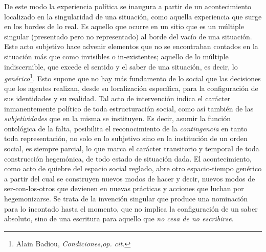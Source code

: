 De este modo la experiencia política se inaugura a partir de un
acontecimiento localizado en la singularidad de una situación, como
aquella experiencia que surge en los bordes de lo real. Es aquello que
ocurre en un sitio que es un múltiple singular (presentado pero no
representado) al borde del vacío de una situación. Este acto subjetivo
hace advenir elementos que no se encontraban contados en la situación
más que como invisibles o in-existentes; aquello de lo múltiple
indiscernible, que excede el sentido y el saber de una situación, es
decir, lo \emph{genérico}\footnote{Alain Badiou, \emph{Condiciones,op.
  cit.}}. Esto supone que no hay más fundamento de lo social que las
decisiones que los agentes realizan, desde su localización específica,
para la configuración de sus identidades y su realidad. Tal acto de
intervención indica el carácter inmanentemente político de toda
estructuración social, como así también de las \emph{subjetividades} que
en la misma se instituyen. Es decir, asumir la función ontológica de la
falta, posibilita el reconocimiento de la \emph{contingencia} en tanto
toda representación, no solo en lo subjetivo sino en la institución de
un orden social, es siempre parcial, lo que marca el carácter
transitorio y temporal de toda construcción hegemónica, de todo estado
de situación dada. El acontecimiento, como acto de quiebre del espacio
social reglado, abre otro espacio-tiempo genérico a partir del cual se
construyen nuevos modos de hacer y decir, nuevos modos de
ser-con-los-otros que devienen en nuevas prácticas y acciones que luchan
por hegemonizarse. Se trata de la invención singular que produce una
nominación para lo incontado hasta el momento, que no implica la
configuración de un saber absoluto, sino de una escritura para aquello
que \emph{no cesa de no escribirse}.

